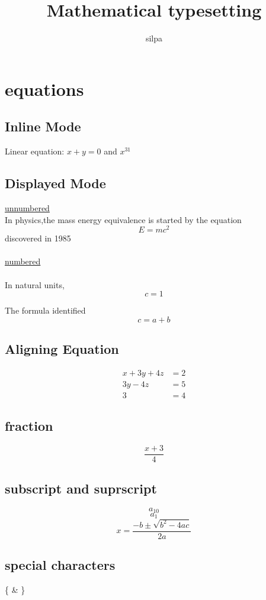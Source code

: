 \documentclass[12pt]{book}
\begin{document}
\title{Mathematical typesetting}
\author{silpa}
\maketitle

\chapter{equations}
\section{Inline Mode}
Linear equation: $ x+y=0 $ and $ x^{31}$

\section{Displayed Mode}
\underline{unnumbered}\\
In physics,the mass energy equivalence is started by the equation $$ E=mc^2 $$discovered in 1985\\ \\

\underline{numbered}\\ \\
In natural units,
\begin{displaymath}
c=1
\end{displaymath}

The formula identified
\begin{equation}
c=a+b
\end{equation}
\section{Aligning Equation}
\begin{align*}
x+3y+4z&=2 \\
3y-4z&=5\\
3&=4
\end{align*}
\section{fraction}
$$ \frac{x+3}{4} $$
\section{subscript and suprscript}
$$ a_{10} $$ 
$$ a_1 $$
$$ x=\frac{-b \pm \sqrt{b^2-4ac}}{2a} $$

\section{special characters}
\{ \& \}
\end{document}
